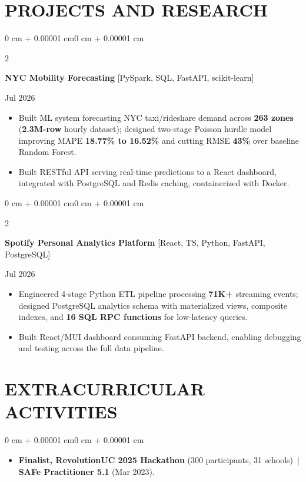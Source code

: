 \documentclass[10pt, letterpaper]{article}
\newenvironment{highlights}{
    \begin{itemize}[
        topsep=0.10 cm,
        parsep=0.06 cm,
        partopsep=0pt,
        itemsep=0.06 cm,
        leftmargin=12pt
    ]
}{
    \end{itemize}
}
\newenvironment{onecolentry}{
    \begin{adjustwidth}{0 cm + 0.00001 cm}{0 cm + 0.00001 cm}
}{
    \end{adjustwidth}
}
\newenvironment{twocolentry}[2][]{
    \onecolentry
    \def\secondColumn{#2}
    \setcolumnwidth{\fill, 4.5 cm}
    \begin{paracol}{2}
}{
    \switchcolumn \raggedleft \secondColumn
    \end{paracol}
    \endonecolentry
}
\begin{document}
\section{PROJECTS AND RESEARCH}
\begin{twocolentry}{Jul 2026}
\textbf{NYC Mobility Forecasting} [PySpark, SQL, FastAPI, scikit-learn]
\end{twocolentry}
\begin{highlights}
  \item Built ML system forecasting NYC taxi/rideshare demand across \textbf{263 zones} (\textbf{2.3M-row} hourly dataset); designed two-stage Poisson hurdle model improving MAPE \textbf{18.77\% to 16.52\%} and cutting RMSE \textbf{43\%} over baseline Random Forest.
  \item Built RESTful API serving real-time predictions to a React dashboard, integrated with PostgreSQL and Redis caching, containerized with Docker.
\end{highlights}

\vspace{0.12 cm}

\begin{twocolentry}{Jul 2026}
\textbf{Spotify Personal Analytics Platform} [React, TS, Python, FastAPI, PostgreSQL]
\end{twocolentry}
\begin{highlights}
  \item Engineered 4-stage Python ETL pipeline processing \textbf{71K+} streaming events; designed PostgreSQL analytics schema with materialized views, composite indexes, and \textbf{16 SQL RPC functions} for low-latency queries.
  \item Built React/MUI dashboard consuming FastAPI backend, enabling debugging and testing across the full data pipeline.
\end{highlights}

\section{EXTRACURRICULAR ACTIVITIES}
\begin{onecolentry}
\begin{highlights}
  \item \textbf{Finalist, RevolutionUC 2025 Hackathon} (300 participants, 31 schools) \,|\, \textbf{SAFe Practitioner 5.1} (Mar 2023).
\end{highlights}
\end{onecolentry}
\end{document}
